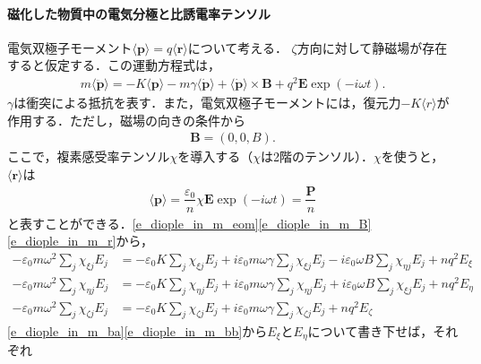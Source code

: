 \paragraph{磁化した物質中の電気分極と比誘電率テンソル}
電気双極子モーメント$\langle{\boldsymbol{p}}\rangle=q\langle{\boldsymbol{r}}\rangle$について考える．
$\zeta$方向に対して静磁場が存在すると仮定する．この運動方程式は，
\begin{align}
  m\langle\ddot{\boldsymbol{p}}\rangle = - K\langle{\boldsymbol{p}}\rangle - m\gamma\langle\dot{\boldsymbol{p}}\rangle + \langle\dot{\boldsymbol{p}}\rangle\times\boldsymbol{B} + q^2\boldsymbol{E}\exp( - i\omega t).
  \label{e_diople_in_m_eom}
\end{align}
$\gamma$は衝突による抵抗を表す．また，電気双極子モーメントには，復元力$ - K\langle{r}\rangle$が作用する．ただし，磁場の向きの条件から
\begin{align}
  \boldsymbol{B}=(0, 0, B).
  \label{e_diople_in_m_B}
\end{align}
ここで，複素感受率テンソル$\chi$を導入する（$\chi$は2階のテンソル）．$\chi$を使うと，$\langle\boldsymbol{r}\rangle$は
\begin{align}
  \langle\boldsymbol{p}\rangle = \dfrac{\varepsilon_0}{n}\chi\boldsymbol{E}\exp( - i\omega t) = \dfrac{\boldsymbol{P}}{n}
  \label{e_diople_in_m_r}
\end{align}
と表すことができる．\eqref{e_diople_in_m_eom}\eqref{e_diople_in_m_B}\eqref{e_diople_in_m_r}から，
\begin{align}
  - \varepsilon_0{m\omega^2}\sum_{{j}}\chi_{\xi{j}}E_{{j}} &=  - \varepsilon_0K\sum_{{j}}\chi_{\xi{j}}E_{{j}}+i\varepsilon_0{m\omega\gamma}\sum_{{j}}\chi_{\xi{j}}E_{{j}} - i\varepsilon_0\omega B\sum_{{j}}\chi_{\eta{j}}E_{{j}}+nq^2E_\xi
  \label{e_diople_in_m_ba} \\
  - \varepsilon_0{m\omega^2}\sum_{{j}}\chi_{\eta{j}}E_{{j}} &=  - \varepsilon_0K\sum_{{j}}\chi_{\eta{j}}E_{{j}}+i\varepsilon_0{m\omega\gamma}\sum_{{j}}\chi_{\eta{j}}E_{{j}}+i\varepsilon_0\omega B\sum_{{j}}\chi_{\xi{j}}E_{{j}}+nq^2E_\eta
  \label{e_diople_in_m_bb} \\
  - \varepsilon_0{m\omega^2}\sum_{{j}}\chi_{\zeta{j}}E_{{j}} &=  - \varepsilon_0K\sum_{{j}}\chi_{\zeta{j}}E_{{j}}+i\varepsilon_0{m\omega\gamma}\sum_{{j}}\chi_{\zeta{j}}E_{{j}}+nq^2E_\zeta
  \label{e_diople_in_m_bc}
\end{align}
\eqref{e_diople_in_m_ba}\eqref{e_diople_in_m_bb}から$E_\xi$と$E_\eta$について書き下せば，それぞれ

